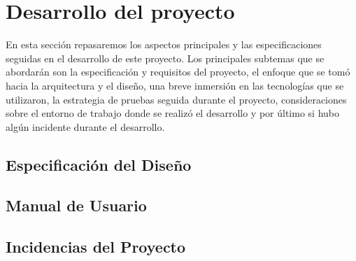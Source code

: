 \section{Desarrollo del proyecto}
En esta sección repasaremos los aspectos principales y las especificaciones seguidas 
en el desarrollo de este proyecto. Los principales subtemas que se abordarán son la 
especificación y requisitos del proyecto, el enfoque que se tomó hacia la arquitectura 
y el diseño, una breve inmersión en las tecnologías que se utilizaron, la estrategia de 
pruebas seguida durante el proyecto, consideraciones sobre el entorno de trabajo donde 
se realizó el desarrollo y por último si hubo algún incidente durante el desarrollo.


\subsection{Especificación del Diseño}



\subsection{Manual de Usuario}
\subsection{Incidencias del Proyecto}
\pagebreak